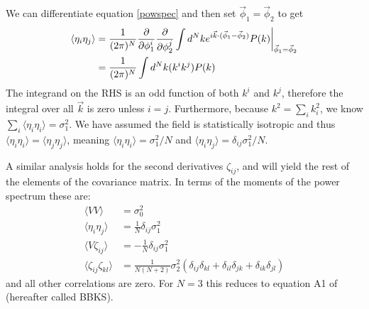 \documentclass[12pt]{article}
\begin{document}
We can differentiate equation \eqref{powspec} and then set $\vec{\phi}_1 = \vec{\phi}_2$ to get
%
\begin{align*}
\langle \eta_{i}\eta_{j}\rangle &= \frac{1}{(2\pi)^N} \frac{\partial}{\partial \phi_1^i}\frac{\partial}{\partial \phi_2^j} \int d^Nk e^{i \vec{k} \cdot (\vec{\phi}_1-\vec{\phi}_2)} P(k)\bigg{|}_{\vec{\phi}_1=\vec{\phi}_2}\\
&= \frac{1}{(2\pi)^N}\int d^Nk (k^i k^j) P(k)
\end{align*}
%
The integrand on the RHS is an odd function of both $k^i$ and $k^j$, therefore the integral over all $\vec{k}$ is zero unless $i=j$. Furthermore, because $k^2 = \sum_i k_i^2$, we know  $\sum_i \langle \eta_{i}\eta_{i}\rangle = \sigma_1^2$. We have assumed the field is statistically isotropic and thus $\langle \eta_{i}\eta_{i}\rangle=\langle \eta_{j}\eta_{j}\rangle$, meaning $\langle \eta_{i}\eta_{i}\rangle=\sigma_1^2/N$ and $\langle \eta_{i}\eta_{j}\rangle=\delta_{ij}\sigma_1^2/N$.


A similar analysis holds for the second derivatives $\zeta_{ij}$, and will yield the rest of the elements of the covariance matrix. In terms of the moments of the power spectrum these are:
%
\begin{equation} \label{corr}
\begin{split}
\langle VV \rangle &= \sigma_0^2 \\
\langle\eta_i\eta_j\rangle &= \frac{1}{N}\delta_{ij}\sigma_1^2 \\
\langle V\zeta_{ij}\rangle &= -\frac{1}{N}\delta_{ij}\sigma_1^2 \\
\langle\zeta_{ij}\zeta_{kl}\rangle &= \frac{1}{N(N+2)}\sigma_2^2(\delta_{ij}\delta_{kl}+\delta_{il}\delta_{jk}+\delta_{ik}\delta_{jl})
\end{split}
\end{equation}
%
and all other correlations are zero. For $N=3$ this reduces to equation A1 of \cite{BBKS} (hereafter called BBKS). 
\end{document}
